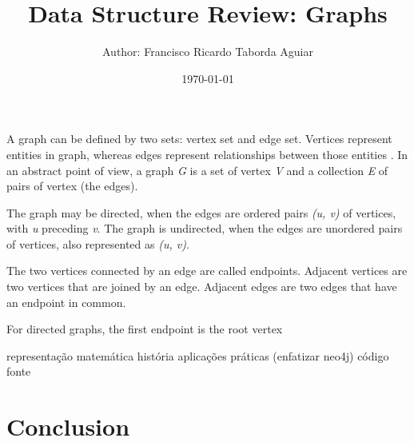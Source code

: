 \documentclass[a4paper]{article}
\title{
    Data Structure Review: Graphs\\
}
\author{
    \small{Author: Francisco Ricardo Taborda Aguiar}\\
}
\date{\today}
\begin{document}
    \maketitle

    A graph can be defined by two sets: vertex set and edge set. 
    Vertices represent entities in graph, whereas edges represent 
    relationships between those entities \cite{xia:2021}.
    In an abstract point of view, a graph \emph{G} is a set of vertex 
    \emph{V} and a collection \emph{E} of pairs of vertex (the edges).

    The graph may be directed, when the edges are ordered pairs 
    \emph{(u, v)} of vertices, with \emph{u} preceding \emph{v}.
    The graph is undirected, when the edges are unordered pairs of 
    vertices, also represented as \emph{(u, v)}.

    The two vertices connected by an edge are called endpoints.
    Adjacent vertices are two vertices that are joined by an edge.
    Adjacent edges are two edges that have an endpoint in common.
    
    For directed graphs, the first endpoint is the root vertex


    representação matemática
    história
    aplicações práticas (enfatizar neo4j)
    código fonte

        \cite{goodrich:2014}


    \section*{Conclusion}

    
     
\end{document}
